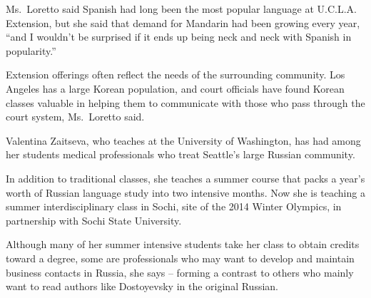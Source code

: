 ﻿\documentclass[12pt]{article}
\begin{document}
Ms.~Loretto said Spanish had long been the most popular language at U.C.L.A. Extension, but she said
that demand for Mandarin had been growing every year, ``and I wouldn't be surprised if it ends up
being neck and neck with Spanish in popularity.''

Extension offerings often reflect the needs of the surrounding community. Los Angeles has a large
Korean population, and court officials have found Korean classes valuable in helping them to
communicate with those who pass through the court system, Ms.~Loretto said.

Valentina Zaitseva, who teaches at the University of Washington, has had among her students medical
professionals who treat Seattle's large Russian community.

In addition to traditional classes, she teaches a summer course that packs a year's worth of Russian
language study into two intensive months. Now she is teaching a summer interdisciplinary class in
Sochi, site of the 2014 Winter Olympics, in partnership with Sochi State University.

Although many of her summer intensive students take her class to obtain credits toward a degree,
some are professionals who may want to develop and maintain business contacts in Russia, she says --
forming a contrast to others who mainly want to read authors like Dostoyevsky in the original
Russian.



\end{document}
